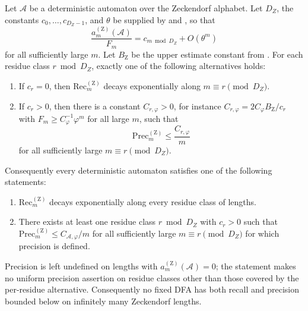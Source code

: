 \begin{corollary}
  \label{cor:zeck-recall-precision}
  Let \(\mathcal A\) be a deterministic automaton over the Zeckendorf
  alphabet. Let \(D_Z\), the constants \(c_0,\dots,c_{D_Z-1}\), and
  \(\theta\) be supplied by
   and , so that
  \[
    \frac{a_m^{(\mathrm Z)}(\mathcal A)}{F_m}
    =c_{m\bmod D_Z}+O(\theta^m)
  \]
  for all sufficiently large \(m\). Let \(B_{\mathrm Z}\) be the upper
  estimate constant from . For each residue
  class \(r\bmod D_Z\), exactly one of the following alternatives holds:
  \begin{enumerate}[label=\textup{(\alph*)}]
    \item If \(c_r=0\), then
    \(\mathrm{Rec}_m^{(\mathrm Z)}\) decays exponentially along
    \(m\equiv r\pmod {D_Z}\).
    \item If \(c_r>0\), then there is a constant
    \(C_{r,\varphi}>0\), for instance
    \(C_{r,\varphi}=2C_\varphi B_{\mathrm Z}/c_r\) with
    \(F_m\ge C_\varphi^{-1}\varphi^m\) for all large \(m\), such that
    \[
      \mathrm{Prec}_m^{(\mathrm Z)}\le \frac{C_{r,\varphi}}{m}
    \]
    for all sufficiently large \(m\equiv r\pmod {D_Z}\).
  \end{enumerate}
  Consequently every deterministic automaton satisfies one of the
  following statements:
  \begin{enumerate}[label=\textup{(\roman*)}]
    \item \(\mathrm{Rec}_m^{(\mathrm Z)}\) decays exponentially along
    every residue class of lengths.
    \item There exists at least one residue class \(r\bmod D_Z\) with
    \(c_r>0\) such that
    \(\mathrm{Prec}_m^{(\mathrm Z)}\le C_{\mathcal A,\varphi}/m\) for
    all sufficiently large \(m\equiv r\pmod {D_Z}\) for which precision is
    defined.
  \end{enumerate}
  Precision is left undefined on lengths with
  \(a_m^{(\mathrm Z)}(\mathcal A)=0\); the statement makes no uniform
  precision assertion on residue classes other than those covered by
  the per-residue alternative.
  Consequently no fixed DFA has both recall and precision bounded below
  on infinitely many Zeckendorf lengths.
\end{corollary}

